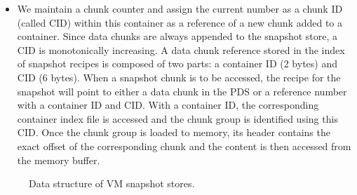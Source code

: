 \begin{itemize}
\begin{itemize}
\item We maintain  a chunk counter and assign the current number 
as a chunk ID (called CID) within this container as a reference of a new chunk added to a container. 
Since data chunks are always appended to the snapshot store, 
 a CID is monotonically increasing.
A data chunk reference stored in the index of snapshot recipes
is composed of two parts: a container ID (2 bytes) and CID (6 bytes).
When a snapshot chunk is to be accessed, the recipe for the snapshot will point to either a data chunk
in the PDS or a reference number with a container ID and CID.
With a container ID, the corresponding container index file is accessed and 
the chunk group is identified using this CID. Once the chunk group is loaded to memory, its header contains the exact offset of the corresponding chunk and the content is then accessed from the memory buffer.

	\end{itemize}
\end{itemize}


 


\begin{figure}[htbp]
  \centering
  \caption{Data structure of VM snapshot stores.}
  \label{fig:as_arch}
\end{figure}

